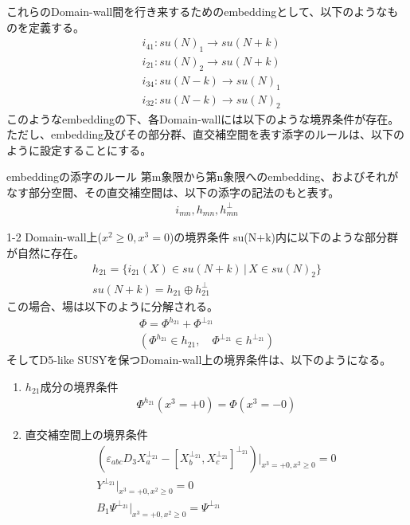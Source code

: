 \documentclass[dvipdfmx,a4paper,10.5pt]{article}
\numberwithin{equation}{section}
\begin{document}
これらのDomain-wall間を行き来するためのembeddingとして、以下のようなものを定義する。
\begin{align*}
        &i_{41}:su(N)_{1}\to su(N+k)\\
        &i_{21}:su(N)_{2}\to su(N+k)\\
        &i_{34}:su(N-k)\to su(N)_{1}\\
    &i_{32}:su(N-k)\to su(N)_{2}
\end{align*}
このようなembeddingの下、各Domain-wallには以下のような境界条件が存在。ただし、embedding及びその部分群、直交補空間を表す添字のルールは、以下のように設定することにする。
\begin{defbox}{embeddingの添字のルール}
    第m象限から第n象限へのembedding、およびそれがなす部分空間、その直交補空間は、以下の添字の記法のもと表す。
    \begin{align*}
        i_{mn},h_{mn},h^{\perp}_{mn}
    \end{align*}
\end{defbox}
\begin{resultbox}{1-2 Domain-wall上($x^{2}\geq0,x^{3}=0$)の境界条件}
su(N+k)内に以下のような部分群が自然に存在。
    \begin{gather*}
        h_{21}=\{i_{21}(X)\in su(N+k)\,|\,X\in su(N)_{2}\}\\
        su(N+k)=h_{21}\oplus h_{21}^{\perp}
    \end{gather*}
    この場合、場は以下のように分解される。
    \begin{gather*}
        \Phi=\Phi^{h_{21}}+\Phi^{\perp_{21}}\\
        (\Phi^{h_{21}}\in h_{21},\quad \Phi^{\perp_{21}}\in h^{\perp_{21}})
    \end{gather*}
    そしてD5-like SUSYを保つDomain-wall上の境界条件は、以下のようになる。
    \begin{enumerate}
        \item $h_{21}$成分の境界条件
        \begin{align*}
            \Phi^{h_{21}}(x^{3}=+0)=\Phi(x^{3}=-0)
        \end{align*}
        \item 直交補空間上の境界条件
        \begin{gather*}
            (\varepsilon_{abc}D_{3}X_{a}^{\perp_{21}}-[X_{b}^{\perp_{21}},X_{c}^{\perp_{21}}]^{\perp_{21}})|_{x^{3}=+0,x^{2}\geq 0}=0\\
            Y^{\perp_{21}}|_{x^{3}=+0,x^{2}\geq 0}=0\\
            B_{1}\Psi^{\perp_{21}}|_{x^{3}=+0,x^{2}\geq 0}=\Psi^{\perp_{21}}
        \end{gather*}
    \end{enumerate}    
\end{resultbox}
\end{document}
